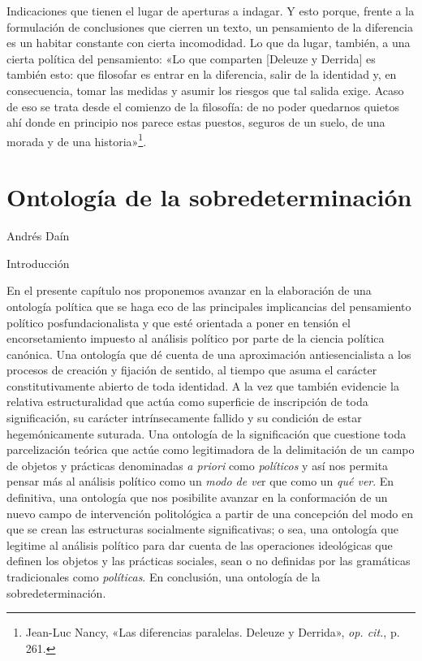 Indicaciones que tienen el lugar de aperturas a indagar. Y esto porque, frente a la formulación de conclusiones que cierren un texto, un pensamiento de la diferencia es un habitar constante con cierta incomodidad. Lo que da lugar, también, a una cierta política del pensamiento: «Lo que comparten {[}Deleuze y Derrida{]} es también esto: que filosofar es entrar en la diferencia, salir de la identidad y, en consecuencia, tomar las medidas y asumir los riesgos que tal salida exige. Acaso de eso se trata desde el comienzo de la filosofía: de no poder quedarnos quietos ahí donde en principio nos parece estas puestos, seguros de un suelo, de una morada y de una historia»\footnote{Jean-Luc Nancy, «Las diferencias paralelas. Deleuze y Derrida», \emph{op. cit.}, p. 261.}.

\chapter{Ontología de la sobredeterminación}

Andrés Daín


{Introducción}


En el presente capítulo nos proponemos avanzar en la elaboración de una ontología política que se haga eco de las principales implicancias del pensamiento político posfundacionalista y que esté orientada a poner en tensión el encorsetamiento impuesto al análisis político por parte de la ciencia política canónica. Una ontología que dé cuenta de una aproximación antiesencialista a los procesos de creación y fijación de sentido, al tiempo que asuma el carácter constitutivamente abierto de toda identidad. A la vez que también evidencie la relativa estructuralidad que actúa como superficie de inscripción de toda significación, su carácter intrínsecamente fallido y su condición de estar hegemónicamente suturada. Una ontología de la significación que cuestione toda parcelización teórica que actúe como legitimadora de la delimitación de un campo de objetos y prácticas denominadas \emph{a priori} como \emph{políticos} y así nos permita pensar más al análisis político como un \emph{modo de ve}r que como un \emph{qué ver}. En definitiva, una ontología que nos posibilite avanzar en la conformación de un nuevo campo de intervención politológica a partir de una concepción del modo en que se crean las estructuras socialmente significativas; o sea, una ontología que legitime al análisis político para dar cuenta de las operaciones ideológicas que definen los objetos y las prácticas sociales, sean o no definidas por las gramáticas tradicionales como \emph{políticas}. En conclusión, una ontología de la sobredeterminación.

